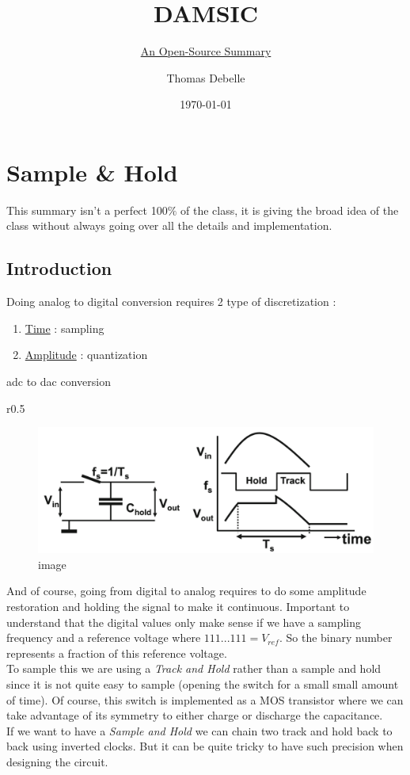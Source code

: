 \documentclass[
  a4paper,
]{article}
\title{DAMSIC}
\subtitle{\href{https://github.com/Tfloow/ESATSummary}{An Open-Source
Summary}}
\author{Thomas Debelle}
\date{\today}
\begin{document}
\maketitle

{
\setcounter{tocdepth}{3}
\tableofcontents
}
\hypertarget{sample-hold}{%
\section{Sample \& Hold}\label{sample-hold}}

This summary isn't a perfect 100\(\%\) of the class, it is giving the
broad idea of the class without always going over all the details and
implementation.

\hypertarget{introduction}{%
\subsection{Introduction}\label{introduction}}

Doing analog to digital conversion requires 2 type of discretization :

\begin{enumerate}
\def\labelenumi{\arabic{enumi}.}
\item
  \ul{Time} : sampling
\item
  \ul{Amplitude} : quantization
\end{enumerate}

{adc} to {dac} conversion

r0.5

\begin{figure}
\centering
\includegraphics{img/th.png}
\caption{image}
\end{figure}

And of course, going from digital to analog requires to do some
amplitude restoration and holding the signal to make it continuous.
Important to understand that the digital values only make sense if we
have a sampling frequency and a reference voltage where
\(111...111 = V_{ref}\). So the binary number represents a fraction of
this reference voltage.\\
To sample this we are using a \emph{Track and Hold} rather than a sample
and hold since it is not quite easy to sample (opening the switch for a
small small amount of time). Of course, this switch is implemented as a
MOS transistor where we can take advantage of its symmetry to either
charge or discharge the capacitance.\\
If we want to have a \emph{Sample and Hold} we can chain two track and
hold back to back using inverted clocks. But it can be quite tricky to
have such precision when designing the circuit.
\end{document}
